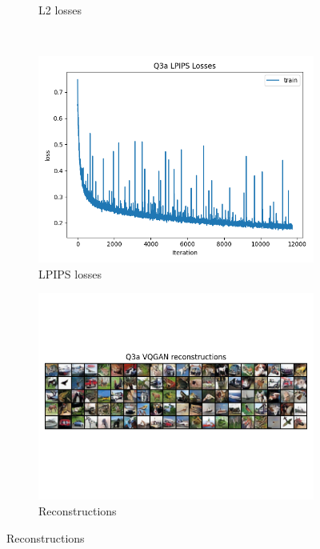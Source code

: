 \documentclass{article}
\begin{document}
\begin{figure}[H]
\begin{subfigure}{0.45\textwidth}
        \caption{L2 losses}
    \end{subfigure}
    \\
    \begin{subfigure}{0.4\textwidth}
        \centering
        \includegraphics[width=\textwidth]{figures/q3a_lpips_losses.png}
        \caption{LPIPS losses}
    \end{subfigure}
    \begin{subfigure}{0.6\textwidth}
        \centering
        \includegraphics[width=\textwidth]{figures/q3a_reconstructions.png}
        \caption{Reconstructions}
    \end{subfigure}
\end{figure}
\end{document}
